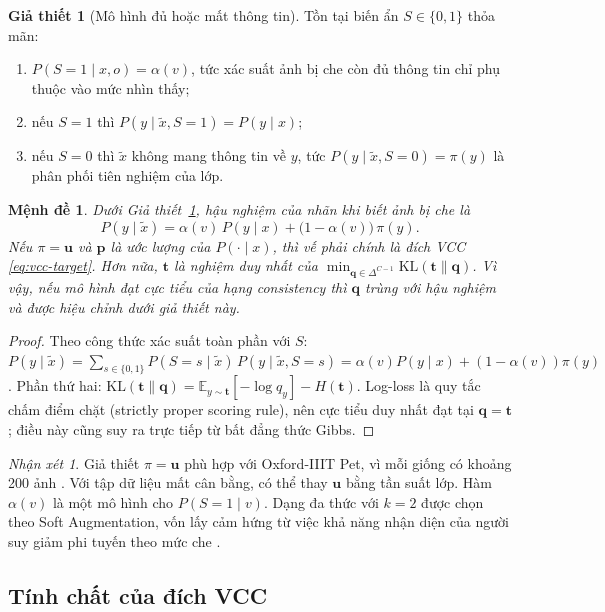 \documentclass[11pt,a4paper]{article}
\theoremstyle{plain}
\newtheorem{proposition}{Mệnh đề}
\theoremstyle{definition}
\newtheorem{assumption}{Giả thiết}
\theoremstyle{remark}
\newtheorem{remark}{Nhận xét}
\newcommand{\E}{\mathbb{E}}
\newcommand{\Simplex}{\Delta^{C-1}}
\newcommand{\KL}{\mathrm{KL}}
\newcommand{\bp}{\bm{p}}
\newcommand{\bq}{\bm{q}}
\newcommand{\bt}{\bm{t}}
\newcommand{\bu}{\bm{u}}
\newcommand{\xt}{\tilde{x}}
\begin{document}
\begin{assumption}[Mô hình đủ hoặc mất thông tin]
\label{ass:sufficiency}
Tồn tại biến ẩn $S\in\{0,1\}$ thỏa mãn:
\begin{enumerate}[label=(\roman*),itemsep=1pt]
  \item $P(S=1\mid x,o)=\alpha(v)$, tức xác suất ảnh bị che còn đủ thông tin chỉ phụ thuộc vào mức nhìn thấy;
  \item nếu $S=1$ thì $P(y\mid\xt,S=1)=P(y\mid x)$;
  \item nếu $S=0$ thì $\xt$ không mang thông tin về $y$, tức $P(y\mid\xt,S=0)=\pi(y)$ là phân phối tiên nghiệm của lớp.
\end{enumerate}
\end{assumption}

\begin{proposition}
\label{prop:bayes}
Dưới Giả thiết~\ref{ass:sufficiency}, hậu nghiệm của nhãn khi biết ảnh bị che là
\[
  P(y\mid\xt)=\alpha(v)\,P(y\mid x)+\big(1-\alpha(v)\big)\,\pi(y).
\]
Nếu $\pi=\bu$ và $\bp$ là ước lượng của $P(\cdot\mid x)$, thì vế phải chính là đích VCC \eqref{eq:vcc-target}. Hơn nữa, $\bt$ là nghiệm duy nhất của $\min_{\bq\in\Simplex}\KL(\bt\|\bq)$. Vì vậy, nếu mô hình đạt cực tiểu của hạng consistency thì $\bq$ trùng với hậu nghiệm và được hiệu chỉnh dưới giả thiết này.
\end{proposition}
\begin{proof}
Theo công thức xác suất toàn phần với $S$:
$P(y\mid\xt)=\sum_{s\in\{0,1\}}P(S=s\mid\xt)\,P(y\mid\xt,S=s)=\alpha(v)P(y\mid x)+(1-\alpha(v))\pi(y)$.
Phần thứ hai: $\KL(\bt\|\bq)=\E_{y\sim\bt}[-\log q_y]-H(\bt)$. Log-loss là quy tắc chấm điểm chặt (strictly proper scoring rule), nên cực tiểu duy nhất đạt tại $\bq=\bt$; điều này cũng suy ra trực tiếp từ bất đẳng thức Gibbs.
\end{proof}

\begin{remark}
Giả thiết $\pi=\bu$ phù hợp với Oxford-IIIT Pet, vì mỗi giống có khoảng 200 ảnh \cite{parkhi2012cats}. Với tập dữ liệu mất cân bằng, có thể thay $\bu$ bằng tần suất lớp. Hàm $\alpha(v)$ là một mô hình cho $P(S=1\mid v)$. Dạng đa thức với $k=2$ được chọn theo Soft Augmentation, vốn lấy cảm hứng từ việc khả năng nhận diện của người suy giảm phi tuyến theo mức che \cite{liu2023soft}.
\end{remark}

\subsection{Tính chất của đích VCC}
\end{document}
